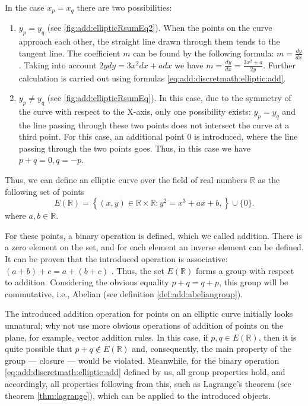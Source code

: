 In the case $x_p = x_q$ there are two possibilities:
\begin{enumerate}
\item $y_p = y_q$ (see \autoref{fig:add:ellipticRsumEq2}). When the points on the curve approach each other, the straight line drawn through them tends to the tangent line. The coefficient $m$ can be found by the following formula: $m = \frac{dy}{dx}$. Taking into account $2 y dy = 3 x^2 dx + a dx$ we have $m = \frac{dy}{dx} = \frac{3 x^2 + a}{2 y}$. Further calculation is carried out using formulas \eqref{eq:add:discretmath:elliptic:add}. 
\item $y_p \ne y_q$ (see \autoref{fig:add:ellipticRsumEq}). In this case, due to the symmetry of the curve with respect to the X-axis, only one possibility exists: $y_p = y_q$ and the line passing through these two points does not intersect the curve at a third point. For this case, an additional point $0$ is introduced, where the line passing through the two points goes. Thus, in this case we have $p + q = 0, q = -p$.
\end{enumerate}

Thus, we can define an elliptic curve over the field of real numbers $\mathbb{R}$
as the following set of points
\begin{equation}
E\left(\mathbb{R}\right) = \left\{ (x,y) \in \mathbb{R} \times \mathbb{R}:
y^2 = x^3 +ax +b, 
\right\} \cup \{0\}.
\label{eq:add:discretmath:elliptic:er}
\end{equation}
where $a,b \in \mathbb{R}$.

For these points, a binary operation is defined, which we called addition. There is a zero element on the set, and for each element an inverse element can be defined. It can be proven that the introduced operation is associative: $(a+b) + c = a + (b+c)$ \cite{Washington:2008:ECN:1388394}. Thus, the set $E\left(\mathbb{R}\right)$ forms a group with respect to addition. Considering the obvious equality $p + q = q + p$, this group will be commutative, i.e., Abelian (see definition \ref{def:add:abeliangroup}).   

\begin{remark}
The introduced addition operation for points on an elliptic curve initially looks unnatural; why not use more obvious operations of addition of points on the plane, for example, vector addition rules. In this case, if $p,q \in E\left(\mathbb{R}\right)$, then it is quite possible that $p + q \not\in E\left(\mathbb{R}\right)$ and, consequently, the main property of the group — closure — would be violated. Meanwhile, for the binary operation \eqref{eq:add:discretmath:elliptic:add} defined by us, all group properties hold, and accordingly, all properties following from this, such as Lagrange's theorem (see theorem \ref{thm:lagrange}),  which can be applied to the introduced objects.
\end{remark}


